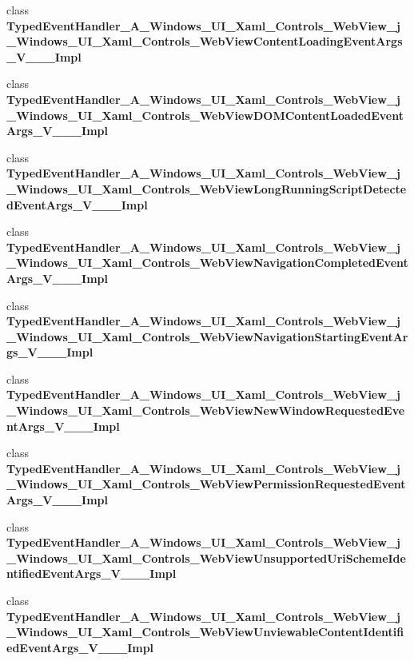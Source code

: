 \begin{DoxyCompactItemize}
class {\bfseries Typed\+Event\+Handler\+\_\+\+A\+\_\+\+Windows\+\_\+\+U\+I\+\_\+\+Xaml\+\_\+\+Controls\+\_\+\+Web\+View\+\_\+j\+\_\+\+Windows\+\_\+\+U\+I\+\_\+\+Xaml\+\_\+\+Controls\+\_\+\+Web\+View\+Content\+Loading\+Event\+Args\+\_\+\+V\+\_\+\+\_\+\+\_\+\+Impl}
\item 
class {\bfseries Typed\+Event\+Handler\+\_\+\+A\+\_\+\+Windows\+\_\+\+U\+I\+\_\+\+Xaml\+\_\+\+Controls\+\_\+\+Web\+View\+\_\+j\+\_\+\+Windows\+\_\+\+U\+I\+\_\+\+Xaml\+\_\+\+Controls\+\_\+\+Web\+View\+D\+O\+M\+Content\+Loaded\+Event\+Args\+\_\+\+V\+\_\+\+\_\+\+\_\+\+Impl}
\item 
class {\bfseries Typed\+Event\+Handler\+\_\+\+A\+\_\+\+Windows\+\_\+\+U\+I\+\_\+\+Xaml\+\_\+\+Controls\+\_\+\+Web\+View\+\_\+j\+\_\+\+Windows\+\_\+\+U\+I\+\_\+\+Xaml\+\_\+\+Controls\+\_\+\+Web\+View\+Long\+Running\+Script\+Detected\+Event\+Args\+\_\+\+V\+\_\+\+\_\+\+\_\+\+Impl}
\item 
class {\bfseries Typed\+Event\+Handler\+\_\+\+A\+\_\+\+Windows\+\_\+\+U\+I\+\_\+\+Xaml\+\_\+\+Controls\+\_\+\+Web\+View\+\_\+j\+\_\+\+Windows\+\_\+\+U\+I\+\_\+\+Xaml\+\_\+\+Controls\+\_\+\+Web\+View\+Navigation\+Completed\+Event\+Args\+\_\+\+V\+\_\+\+\_\+\+\_\+\+Impl}
\item 
class {\bfseries Typed\+Event\+Handler\+\_\+\+A\+\_\+\+Windows\+\_\+\+U\+I\+\_\+\+Xaml\+\_\+\+Controls\+\_\+\+Web\+View\+\_\+j\+\_\+\+Windows\+\_\+\+U\+I\+\_\+\+Xaml\+\_\+\+Controls\+\_\+\+Web\+View\+Navigation\+Starting\+Event\+Args\+\_\+\+V\+\_\+\+\_\+\+\_\+\+Impl}
\item 
class {\bfseries Typed\+Event\+Handler\+\_\+\+A\+\_\+\+Windows\+\_\+\+U\+I\+\_\+\+Xaml\+\_\+\+Controls\+\_\+\+Web\+View\+\_\+j\+\_\+\+Windows\+\_\+\+U\+I\+\_\+\+Xaml\+\_\+\+Controls\+\_\+\+Web\+View\+New\+Window\+Requested\+Event\+Args\+\_\+\+V\+\_\+\+\_\+\+\_\+\+Impl}
\item 
class {\bfseries Typed\+Event\+Handler\+\_\+\+A\+\_\+\+Windows\+\_\+\+U\+I\+\_\+\+Xaml\+\_\+\+Controls\+\_\+\+Web\+View\+\_\+j\+\_\+\+Windows\+\_\+\+U\+I\+\_\+\+Xaml\+\_\+\+Controls\+\_\+\+Web\+View\+Permission\+Requested\+Event\+Args\+\_\+\+V\+\_\+\+\_\+\+\_\+\+Impl}
\item 
class {\bfseries Typed\+Event\+Handler\+\_\+\+A\+\_\+\+Windows\+\_\+\+U\+I\+\_\+\+Xaml\+\_\+\+Controls\+\_\+\+Web\+View\+\_\+j\+\_\+\+Windows\+\_\+\+U\+I\+\_\+\+Xaml\+\_\+\+Controls\+\_\+\+Web\+View\+Unsupported\+Uri\+Scheme\+Identified\+Event\+Args\+\_\+\+V\+\_\+\+\_\+\+\_\+\+Impl}
\item 
class {\bfseries Typed\+Event\+Handler\+\_\+\+A\+\_\+\+Windows\+\_\+\+U\+I\+\_\+\+Xaml\+\_\+\+Controls\+\_\+\+Web\+View\+\_\+j\+\_\+\+Windows\+\_\+\+U\+I\+\_\+\+Xaml\+\_\+\+Controls\+\_\+\+Web\+View\+Unviewable\+Content\+Identified\+Event\+Args\+\_\+\+V\+\_\+\+\_\+\+\_\+\+Impl}

\end{DoxyCompactItemize}
